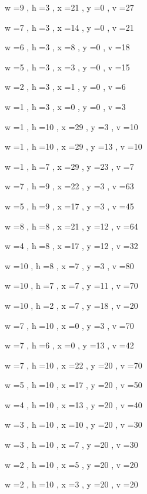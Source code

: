 \documentclass[11pt]{article}
\begin{document}


w =9 , h =3 , x =21 , y =0 , v =27
\par
w =7 , h =3 , x =14 , y =0 , v =21
\par
w =6 , h =3 , x =8 , y =0 , v =18
\par
w =5 , h =3 , x =3 , y =0 , v =15
\par
w =2 , h =3 , x =1 , y =0 , v =6
\par
w =1 , h =3 , x =0 , y =0 , v =3
\par
w =1 , h =10 , x =29 , y =3 , v =10
\par
w =1 , h =10 , x =29 , y =13 , v =10
\par
w =1 , h =7 , x =29 , y =23 , v =7
\par
w =7 , h =9 , x =22 , y =3 , v =63
\par
w =5 , h =9 , x =17 , y =3 , v =45
\par
w =8 , h =8 , x =21 , y =12 , v =64
\par
w =4 , h =8 , x =17 , y =12 , v =32
\par
w =10 , h =8 , x =7 , y =3 , v =80
\par
w =10 , h =7 , x =7 , y =11 , v =70
\par
w =10 , h =2 , x =7 , y =18 , v =20
\par
w =7 , h =10 , x =0 , y =3 , v =70
\par
w =7 , h =6 , x =0 , y =13 , v =42
\par
w =7 , h =10 , x =22 , y =20 , v =70
\par
w =5 , h =10 , x =17 , y =20 , v =50
\par
w =4 , h =10 , x =13 , y =20 , v =40
\par
w =3 , h =10 , x =10 , y =20 , v =30
\par
w =3 , h =10 , x =7 , y =20 , v =30
\par
w =2 , h =10 , x =5 , y =20 , v =20
\par
w =2 , h =10 , x =3 , y =20 , v =20
\par
\newpage
\end{document}

